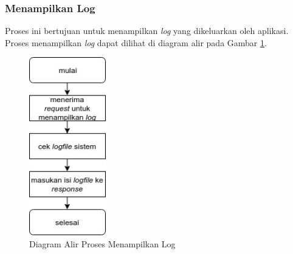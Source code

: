 \subsubsection{Menampilkan Log}
\par Proses ini bertujuan untuk menampilkan \textit{log} yang dikeluarkan oleh aplikasi. Proses menampilkan \textit{log} dapat dilihat di diagram alir pada Gambar \ref{fc:log}.
\begin{figure}[hb]
	\centering\includegraphics[width=0.3\textwidth]{bab3/flowchart/flowchart-menampilkan_log.jpg}
	\caption{Diagram Alir Proses Menampilkan Log} \label{fc:log}
\end{figure}

